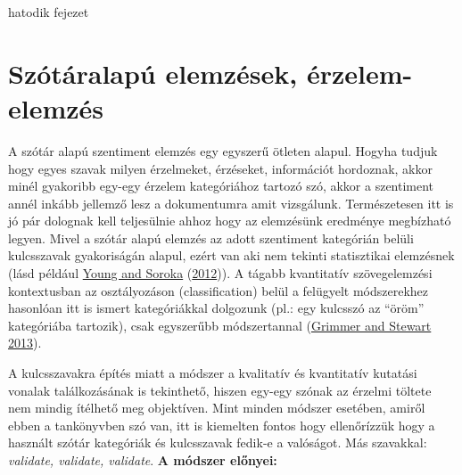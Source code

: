 \documentclass[
]{book}
\begin{document}
hatodik fejezet

\hypertarget{szuxf3tuxe1ralapuxfa-elemzuxe9sek-uxe9rzelem-elemzuxe9s}{%
\chapter{Szótáralapú elemzések,
érzelem-elemzés}\label{szuxf3tuxe1ralapuxfa-elemzuxe9sek-uxe9rzelem-elemzuxe9s}}

A szótár alapú szentiment elemzés egy egyszerű ötleten alapul. Hogyha
tudjuk hogy egyes szavak milyen érzelmeket, érzéseket, információt
hordoznak, akkor minél gyakoribb egy-egy érzelem kategóriához tartozó
szó, akkor a szentiment annél inkább jellemző lesz a dokumentumra amit
vizsgálunk. Természetesen itt is jó pár dolognak kell teljesülnie ahhoz
hogy az elemzésünk eredménye megbízható legyen. Mivel a szótár alapú
elemzés az adott szentiment kategórián belüli kulcsszavak gyakoriságán
alapul, ezért van aki nem tekinti statisztikai elemzésnek (lásd például
\protect\hyperlink{ref-young2012affective}{Young and Soroka}
(\protect\hyperlink{ref-young2012affective}{2012})). A tágabb
kvantitatív szövegelemzési kontextusban az osztályozáson
(classification) belül a felügyelt módszerekhez hasonlóan itt is ismert
kategóriákkal dolgozunk (pl.: egy kulcsszó az ``öröm'' kategóriába
tartozik), csak egyszerűbb módszertannal
(\protect\hyperlink{ref-grimmer2013text}{Grimmer and Stewart 2013}).

A kulcsszavakra építés miatt a módszer a kvalitatív és kvantitatív
kutatási vonalak találkozásának is tekinthető, hiszen egy-egy szónak az
érzelmi töltete nem mindig ítélhető meg objektíven. Mint minden módszer
esetében, amiről ebben a tankönyvben szó van, itt is kiemelten fontos
hogy ellenőrízzük hogy a használt szótár kategóriák és kulcsszavak
fedik-e a valóságot. Más szavakkal: \emph{validate, validate, validate}.
\textbf{A módszer előnyei:}
\end{document}

